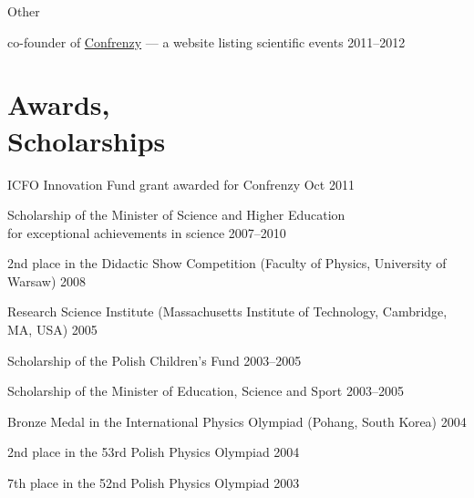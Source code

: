 \documentclass[margin,line]{resume}
\begin{document}
\begin{resume}
     Other
	        \begin{list2}
	    \item co-founder of \href{http://confrenzy.com}{Confrenzy} --- a website listing scientific events \hfill 2011--2012
                \end{list2} 



\vspace{3mm}

    \section{\mysidestyle Awards,\\Scholarships}
    \begin{list2}
    	\item ICFO Innovation Fund grant awarded for Confrenzy \hfill Oct 2011
        \item Scholarship of the Minister of Science and Higher Education\\for exceptional achievements in science \hfill 2007--2010
        \item 2nd  place in the Didactic Show Competition (Faculty of Physics, University of Warsaw)  \hfill 2008  %
        \item Research Science Institute (Massachusetts Institute of Technology, Cambridge, MA, USA) \hfill 2005
        \item Scholarship of the Polish Children's Fund \hfill 2003--2005
        \item Scholarship of the Minister of Education, Science and Sport \hfill 2003--2005
        \item Bronze Medal in the International Physics Olympiad (Pohang, South Korea) \hfill 2004
        \item 2nd  place in the 53rd Polish Physics Olympiad \hfill 2004
        \item 7th  place in the 52nd Polish Physics Olympiad \hfill 2003
    \end{list2}

\vspace{3mm}


\end{resume}
\end{document}
